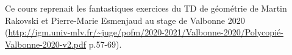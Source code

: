 Ce cours reprenait les fantastiques exercices du TD de géométrie de Martin Rakovski et Pierre-Marie Esmenjaud au stage de Valbonne 2020 (\url{http://igm.univ-mlv.fr/~juge/pofm/2020-2021/Valbonne-2020/Polycopié-Valbonne-2020-v2.pdf} p.57-69).
